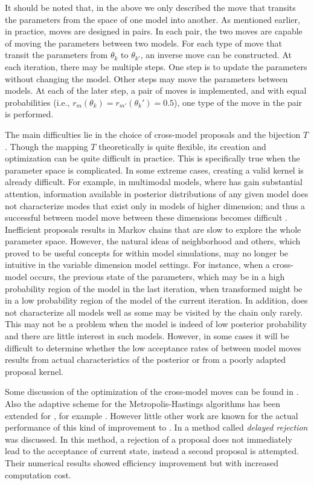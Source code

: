 It should be noted that, in the above we only described the move that
transits the parameters from the space of one model into another. As
mentioned earlier, in practice, \rjmcmc moves are designed in pairs. In each
pair, the two moves are capable of moving the parameters between two models.
For each type of move that transit the parameters from $\theta_k$ to
$\theta_{k'}$, an inverse move can be constructed. At each iteration, there
may be multiple steps. One step is to update the parameters without changing
the model. Other steps may move the parameters between models. At each of the
later step, a pair of moves is implemented, and with equal probabilities
(i.e., $r_m(\theta_k) = r_{m'}(\theta_k') = 0.5$), one type of the move in
the pair is performed.

The main difficulties lie in the choice of cross-model proposals and the
bijection $T$. Though the mapping $T$ theoretically is quite flexible, its
creation and optimization can be quite difficult in practice. This is
specifically true when the parameter space is complicated. In some extreme
cases, creating a valid kernel is already difficult. For example, in
multimodal models, where \rjmcmc has gain substantial attention, information
available in posterior distributions of any given model does not characterize
modes that exist only in models of higher dimension; and thus a successful
between model move between these dimensions becomes difficult
\cite{Jasra:2007id}. Inefficient proposals results in Markov chains that are
slow to explore the whole parameter space. However, the natural ideas of
neighborhood and others, which proved to be useful concepts for within model
simulations, may no longer be intuitive in the variable dimension model
settings. For instance, when a cross-model occurs, the previous state of the
parameters, which may be in a high probability region of the model in the
last iteration, when transformed might be in a low probability region of the
model of the current iteration. In addition, \rjmcmc does not characterize
all models well as some may be visited by the chain only rarely. This may not
be a problem when the model is indeed of low posterior probability and there
are little interest in such models. However, in some cases it will be
difficult to determine whether the low acceptance rates of between model
moves results from actual characteristics of the posterior or from a poorly
adapted proposal kernel.

Some discussion of the optimization of the cross-model moves can be found in
\cite{Green:2009tr}. Also the adaptive scheme for the Metropolis-Hastings
algorithms has been extended for \rjmcmc, for example \cite{Hastie:2005vi}.
However little other work are known for the actual performance of this kind
of improvement to \rjmcmc. In \cite{Green:2001tk} a method called
\emph{delayed rejection} was discussed. In this method, a rejection of a
proposal does not immediately lead to the acceptance of current state,
instead a second proposal is attempted. Their numerical results showed
efficiency improvement but with increased computation cost.

